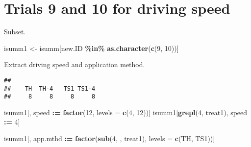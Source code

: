 \documentclass[
]{article}
\newenvironment{Shaded}{\begin{snugshade}}{\end{snugshade}}
\newcommand{\AttributeTok}[1]{\textcolor[rgb]{0.13,0.29,0.53}{#1}}
\newcommand{\DecValTok}[1]{\textcolor[rgb]{0.00,0.00,0.81}{#1}}
\newcommand{\FunctionTok}[1]{\textcolor[rgb]{0.13,0.29,0.53}{\textbf{#1}}}
\newcommand{\NormalTok}[1]{#1}
\newcommand{\OtherTok}[1]{\textcolor[rgb]{0.56,0.35,0.01}{#1}}
\newcommand{\SpecialCharTok}[1]{\textcolor[rgb]{0.81,0.36,0.00}{\textbf{#1}}}
\newcommand{\StringTok}[1]{\textcolor[rgb]{0.31,0.60,0.02}{#1}}
\begin{document}
\section{Trials 9 and 10 for driving
speed}\label{trials-9-and-10-for-driving-speed}

Subset.

\begin{Shaded}
\begin{Highlighting}[]
\NormalTok{isumm1 }\OtherTok{\textless{}{-}}\NormalTok{ isumm[new.ID }\SpecialCharTok{\%in\%} \FunctionTok{as.character}\NormalTok{(}\FunctionTok{c}\NormalTok{(}\DecValTok{9}\NormalTok{, }\DecValTok{10}\NormalTok{))]}
\end{Highlighting}
\end{Shaded}

Extract driving speed and application method.

\begin{Shaded}
\end{Shaded}

\begin{verbatim}
## 
##    TH  TH-4   TS1 TS1-4 
##     8     8     8     8
\end{verbatim}

\begin{Shaded}
\begin{Highlighting}[]
\NormalTok{isumm1[, speed }\SpecialCharTok{:=} \FunctionTok{factor}\NormalTok{(}\StringTok{\textquotesingle{}12\textquotesingle{}}\NormalTok{, }\AttributeTok{levels =} \FunctionTok{c}\NormalTok{(}\DecValTok{4}\NormalTok{, }\DecValTok{12}\NormalTok{))]}
\NormalTok{isumm1[}\FunctionTok{grepl}\NormalTok{(}\StringTok{\textquotesingle{}{-}4\textquotesingle{}}\NormalTok{, treat1), speed }\SpecialCharTok{:=} \StringTok{\textquotesingle{}4\textquotesingle{}}\NormalTok{]}
\end{Highlighting}
\end{Shaded}

\begin{Shaded}
\begin{Highlighting}[]
\NormalTok{isumm1[, app.mthd }\SpecialCharTok{:=} \FunctionTok{factor}\NormalTok{(}\FunctionTok{sub}\NormalTok{(}\StringTok{\textquotesingle{}{-}4\textquotesingle{}}\NormalTok{, }\StringTok{\textquotesingle{}\textquotesingle{}}\NormalTok{, treat1), }\AttributeTok{levels =} \FunctionTok{c}\NormalTok{(}\StringTok{\textquotesingle{}TH\textquotesingle{}}\NormalTok{, }\StringTok{\textquotesingle{}TS1\textquotesingle{}}\NormalTok{))]}
\end{Highlighting}
\end{Shaded}
\end{document}
